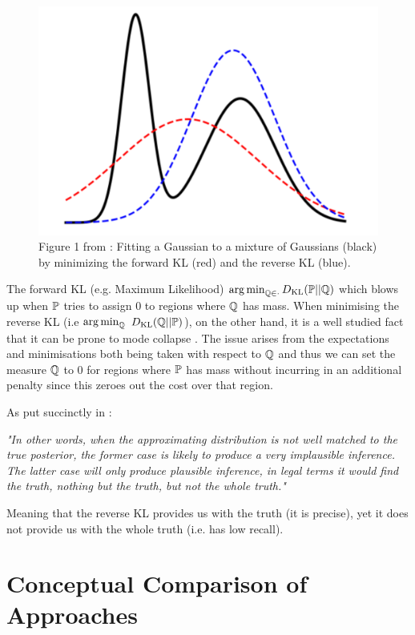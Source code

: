 \documentclass[a4paper,12pt,twoside,openright]{report}
\theoremstyle{definition}
\begin{document}
\begin{figure}
    \centering
    \includegraphics[scale=0.5]{images/zhang_et_al.PNG}
    \caption{Figure 1 from \cite{zhang2019variational}:  Fitting a Gaussian to a mixture of Gaussians (black) by
minimizing the forward KL (red) and the reverse KL (blue).}
    \label{fig:babrber_kl}
\end{figure}

The forward KL (e.g. Maximum Likelihood)  $\argmin_{\Q \in \cdot }\KL(\P ||\Q)$  which blows up  when $\P$ tries to assign $0$ to regions where $\Q$ has mass. When minimising the reverse KL (i.e $\argmin_{\Q }$ $\KL(\Q ||\P)$), on the other hand, it is a well studied fact that it can be prone to mode collapse \citep{zhang2019variational}. The issue arises from the expectations and minimisations both being taken with respect to $\Q$ and thus we can set the measure $\Q$ to 0 for regions where $\P$ has mass without incurring in an additional penalty since this zeroes out the cost over that region.

As put succinctly in \cite{lawrence2001variational}:

\textit{"In other words, when the approximating distribution is not
well matched to the true posterior, the former case is likely to produce a very implausible inference.
The latter case will only produce plausible inference, in legal terms it would find the truth, nothing
but the truth, but not the whole truth."}

Meaning that the reverse KL provides us with the truth (it is precise), yet  it does not provide us with the whole truth (i.e. has low recall).

\section{Conceptual Comparison of Approaches}
\end{document}

